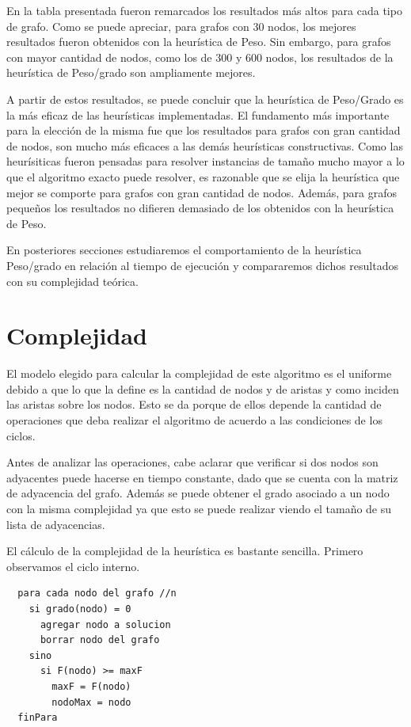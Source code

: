 \documentclass[a4paper,11pt] {article}
\begin{document}
En la tabla presentada fueron remarcados los resultados m\'as altos para cada tipo de grafo. Como se puede apreciar, para grafos con 30 nodos, los mejores resultados fueron obtenidos con la heur\'istica de Peso. Sin embargo, para grafos con mayor cantidad de nodos, como los de 300 y 600 nodos, los resultados de la heur\'istica de Peso/grado son ampliamente mejores.

A partir de estos resultados, se puede concluir que la heur\'istica de Peso/Grado es la m\'as eficaz de las heur\'isticas implementadas.  El fundamento m\'as importante para la elecci\'on de la misma fue que los resultados para grafos con gran cantidad de nodos, son mucho m\'as eficaces a las dem\'as heur\'isticas constructivas. Como las heur\'isiticas fueron pensadas para resolver instancias de tama\~{n}o mucho mayor a lo que el algoritmo exacto puede resolver, es razonable que se elija la heur\'istica que mejor se comporte para grafos con gran cantidad de nodos. Adem\'as, para grafos peque\~{n}os los resultados no difieren demasiado de los obtenidos con la heur\'istica de Peso.

En posteriores secciones estudiaremos el comportamiento de la heur\'istica Peso/grado en relaci\'on al tiempo de ejecuci\'on y compararemos dichos resultados con su complejidad te\'orica.

\section*{Complejidad}

El modelo elegido para calcular la complejidad de este algoritmo es el uniforme debido a que lo que la define es la cantidad de nodos y de aristas y como inciden las aristas sobre los nodos. Esto se da porque de ellos depende la cantidad de operaciones que deba realizar el algoritmo de acuerdo a las condiciones de los ciclos.

Antes de analizar las operaciones, cabe aclarar que verificar si dos nodos son adyacentes puede hacerse en tiempo constante, dado que se cuenta con la matriz de adyacencia del grafo. Además se puede obtener el grado asociado a un nodo con la misma complejidad ya que esto se puede realizar viendo el tamaño de su lista de adyacencias.

El cálculo de la complejidad de la heurística es bastante sencilla. Primero observamos el ciclo interno.

\begin{verbatim}
  para cada nodo del grafo //n
    si grado(nodo) = 0  
      agregar nodo a solucion
      borrar nodo del grafo
    sino
      si F(nodo) >= maxF
        maxF = F(nodo)
        nodoMax = nodo
  finPara
\end{verbatim}
\end{document}
